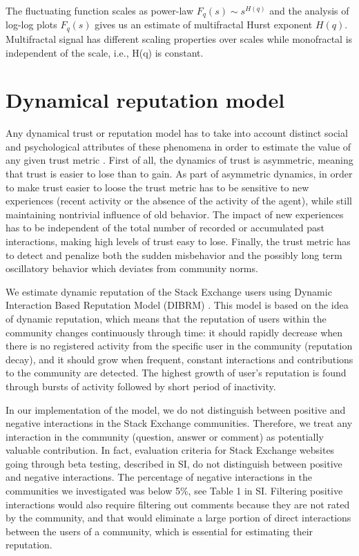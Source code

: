 The fluctuating function scales as power-law $F_q(s) \sim s^{H(q)}$ and the analysis of log-log plots $F_q(s)$ gives us an estimate of multifractal Hurst exponent $H(q)$. Multifractal signal has different scaling properties over scales while monofractal is independent of the scale, i.e., H(q) is constant. 

\section{Dynamical reputation model}

Any dynamical trust or reputation model has to take into account distinct social and psychological attributes of these phenomena in order to estimate the value of any given trust metric \cite{duma2005dynamic}. First of all, the dynamics of trust is asymmetric, meaning that trust is easier to lose than to gain. As part of asymmetric dynamics, in order to make trust easier to loose the trust metric has to be sensitive to new experiences (recent activity or the absence of the activity of the agent), while still maintaining nontrivial influence of old behavior. The impact of new experiences has to be independent of
the total number of recorded or accumulated past interactions, making high levels of trust easy to lose. 
Finally, the trust metric has to detect and penalize both the sudden misbehavior and the possibly long term oscillatory behavior which deviates from community norms.

We estimate dynamic reputation of the Stack Exchange users using Dynamic Interaction Based Reputation Model (DIBRM) \cite{melnikovDynamicInteractionBasedReputation2018}. This model is based on the idea of dynamic reputation, which means that the reputation of users within the community changes continuously through time: it should rapidly decrease when there is no registered activity from the specific user in the community (reputation decay), and it should grow when frequent, constant interactions
and contributions to the community are detected. The highest growth of user's reputation is found through bursts of activity followed by short period of inactivity. 

In our implementation of the model, we do not distinguish between positive and negative interactions in the Stack Exchange communities. Therefore, we treat any interaction in the community (question, answer or comment) as potentially valuable contribution. In fact, evaluation criteria for Stack Exchange websites going through beta testing, described in SI, do not distinguish between positive and negative interactions.
The percentage of negative interactions in the communities we investigated was below 5\%, see Table 1 in SI. Filtering positive interactions would also require filtering out comments because they are not rated by the community, and that would eliminate a large portion of
direct interactions between the users of a community, which is essential for estimating their reputation.

